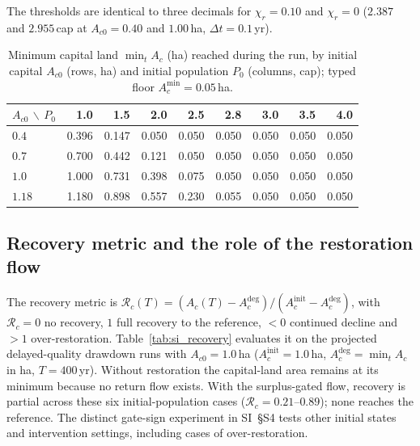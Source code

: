 \documentclass[11pt,a4paper]{article}
\newcommand{\Acmin}{A_c^{\min}}
\begin{document}
The thresholds are identical to three decimals for $\chi_r=0.10$ and $\chi_r=0$ ($2.387$ and $2.955$\,cap at $A_{c0}=0.40$ and $1.00$\,ha, $\Delta t=0.1$\,yr).

\begin{table}[htbp]
\centering\small
\caption{Minimum capital land $\min_tA_c$ (ha) reached during the run, by initial capital $A_{c0}$ (rows, ha) and initial population $P_0$ (columns, cap); typed floor $\Acmin=0.05$\,ha.}
\label{tab:si_drawdown}
\begin{tabular}{lrrrrrrrr}
\toprule
$A_{c0}$ $\backslash$ $P_0$ & 1.0 & 1.5 & 2.0 & 2.5 & 2.8 & 3.0 & 3.5 & 4.0 \\
\midrule
$0.4$ & 0.396 & 0.147 & 0.050 & 0.050 & 0.050 & 0.050 & 0.050 & 0.050 \\
$0.7$ & 0.700 & 0.442 & 0.121 & 0.050 & 0.050 & 0.050 & 0.050 & 0.050 \\
$1.0$ & 1.000 & 0.731 & 0.398 & 0.075 & 0.050 & 0.050 & 0.050 & 0.050 \\
$1.18$ & 1.180 & 0.898 & 0.557 & 0.230 & 0.055 & 0.050 & 0.050 & 0.050 \\
\bottomrule
\end{tabular}
\end{table}

\subsection{Recovery metric and the role of the restoration flow}\label{si:recovery}

The recovery metric is $\mathcal R_c(T)=(A_c(T)-A_c^{\mathrm{deg}})/(A_c^{\mathrm{init}}-A_c^{\mathrm{deg}})$, with $\mathcal R_c=0$ no recovery, $1$ full recovery to the reference, $<0$ continued decline and $>1$ over-restoration. Table~\ref{tab:si_recovery} evaluates it on the projected delayed-quality drawdown runs with $A_{c0}=1.0$\,ha ($A_c^{\mathrm{init}}=1.0$\,ha, $A_c^{\mathrm{deg}}=\min_tA_c$ in ha, $T=400$\,yr). Without restoration the capital-land area remains at its minimum because no return flow exists. With the surplus-gated flow, recovery is partial across these six initial-population cases ($\mathcal R_c=0.21$--$0.89$); none reaches the reference. The distinct gate-sign experiment in SI~\S S4 tests other initial states and intervention settings, including cases of over-restoration.
\end{document}
